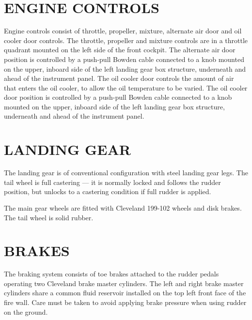 \section{ENGINE CONTROLS} Engine controls consist of throttle, propeller, mixture, alternate air door and oil cooler door controls. The throttle, propeller and mixture controls are in a throttle quadrant mounted on the left side of the front cockpit. The alternate air door position is controlled by a push-pull Bowden cable connected to a knob mounted on the upper, inboard side of the left landing gear box structure, underneath and ahead of the instrument panel. The oil cooler door controls the amount of air that enters the oil cooler, to allow the oil temperature to be varied. The oil cooler door position is controlled by a push-pull Bowden cable connected to a knob mounted on the upper, inboard side of the left landing gear box structure, underneath and ahead of the instrument panel.

\section{LANDING GEAR} The landing gear is of conventional configuration with steel landing gear legs. The tail wheel is full castering --- it is normally locked and follows the rudder position, but unlocks to a castering condition if full rudder is applied.

The main gear wheels are fitted with Cleveland 199-102 wheels and disk brakes. The tail wheel is solid rubber.

\section{BRAKES} The braking system consists of toe brakes attached to the rudder pedals operating two Cleveland brake master cylinders. The left and right brake master cylinders share a common fluid reservoir installed on the top left front face of the fire wall. Care must be taken to avoid applying brake pressure when using rudder on the ground.

